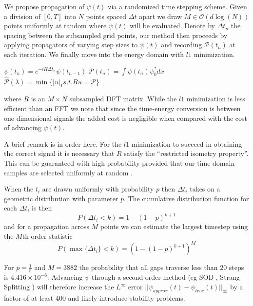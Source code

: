 \documentclass[11pt]{amsart}
\theoremstyle{remark}
\begin{document}
We propose propagation of $\psi(t)$ via a randomized time stepping scheme. Given a division of $[0,T]$ into $N$ points spaced $\Delta t$ apart we draw $M \in \mathcal{O}(d \log(N))$ points uniformly at random where $\psi(t)$ will be evaluated. Denote by $\Delta t_n$ the spacing between the subsampled grid points, our method then proceeds by applying propagators of varying step sizes to $\psi(t)$ and recording $\mathcal{P}(t_n)$ at each iteration. We finally move into the energy domain with $l1$ minimization.

\vspace{11pt}

\begin{algorithmic}
\STATE $\psi(t_n) = e^{-iH\Delta t_n}\psi(t_{n-1})$
\STATE $\mathcal{P}(t_n) = \int \psi(t_n)\psi^*_0 dx$
\ENDFOR
\STATE $\hat{\mathcal{P}}(\lambda) = \min \{ |u|_1 s.t. Ru = \mathcal{P} \}$
\end{algorithmic}

\vspace{11pt}

where $R$ is an $M \times N$ subsampled DFT matrix. While the $l1$ minimization is less efficient than an FFT we note that since the time-energy conversion is between one dimensional signals the added cost is negligible when compared with the cost of advancing $\psi(t)$.

A brief remark is in order here. For the $l1$ minimization to succeed in obtaining the correct signal it is necessary that $R$ satisfy the ``restricted isometry property''\cite{Candes.2006}. This can be guaranteed with high probability provided that our time domain samples are selected uniformly at random \cite{Candes2006}.

When the $t_i$ are drawn uniformly with probability $p$ then $\Delta t_i$ takes on a geometric distribution with parameter $p$. The cumulative distribution function for each $\Delta t_i$ is then
\begin{equation}
P(\Delta t_i < k) = 1 - (1-p)^{k+1}
\end{equation}
and for a propagation across $M$ points we can estimate the largest timestep using the $M$th order statistic
\begin{equation}
P(\max \{\Delta t_i \} < k) = (1 - (1-p)^{k+1})^M
\end{equation}

For $p=\frac{1}{5}$ and $M=3882$ the probability that all gaps traverse less than $20$ steps is $4.416 \times 10^{-6}$. Advancing $\psi$ through a second order method (eg SOD \cite{Fritz1983}, Strang Splitting \cite{FEIT1982}) will therefore increase the $L^\infty$ error $||\psi_{approx}(t) - \psi_{true}(t)||_\infty$ by a factor of at least $400$ and likely introduce stability problems.
\end{document}
